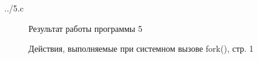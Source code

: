 \documentclass[a4paper,oneside,14pt]{extreport}
\begin{document}
\newpage
\begin{lstinputlisting}[
	caption={Программа 5},
	label={list5},
	style={c},
	]{../5.c}
\end{lstinputlisting}

\begin{figure}[h]
	\caption{Результат работы программы 5}
	\label{5png}
\end{figure}

\newpage
\begin{figure}[h]
	\caption{Действия, выполняемые при системном вызове fork(), стр. 1}
	\label{fork1}
\end{figure}
\end{document}
